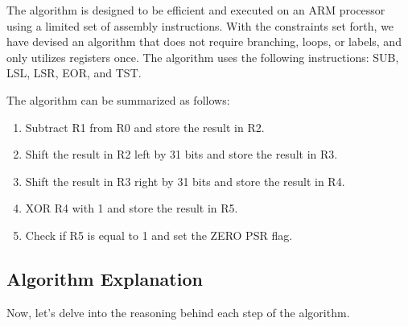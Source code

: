 The algorithm is designed to be efficient and executed on an ARM processor using a limited set of assembly instructions. With the constraints set forth, we have devised an algorithm that does not require branching, loops, or labels, and only utilizes registers once. The algorithm uses the following instructions: SUB, LSL, LSR, EOR, and TST.

The algorithm can be summarized as follows:

\begin{enumerate}
    \item Subtract R1 from R0 and store the result in R2.
    \item Shift the result in R2 left by 31 bits and store the result in R3.
    \item Shift the result in R3 right by 31 bits and store the result in R4.
    \item XOR R4 with 1 and store the result in R5.
    \item Check if R5 is equal to 1 and set the ZERO PSR flag.
\end{enumerate}

\subsection{Algorithm Explanation}

Now, let's delve into the reasoning behind each step of the algorithm.

